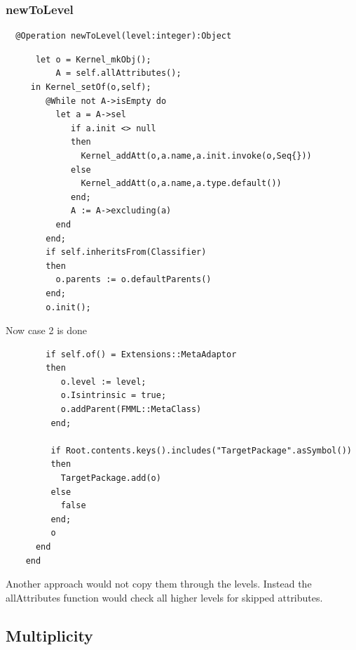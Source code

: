 \documentclass{scrreprt}
\newcounter{myCounter}[subsubsection]
\newcommand{\layerThree}[1]{\subsection{#1} \setcounter{myCounter}{0}}
\newcommand{\layerFour}[1]{\subsubsection{#1}}
\begin{document}
\layerFour{newToLevel}

\begin{verbatim}
  @Operation newToLevel(level:integer):Object
\end{verbatim}
\begin{verbatim}
      let o = Kernel_mkObj();
          A = self.allAttributes();
     in Kernel_setOf(o,self);
        @While not A->isEmpty do
          let a = A->sel
             if a.init <> null
             then
               Kernel_addAtt(o,a.name,a.init.invoke(o,Seq{}))
             else
               Kernel_addAtt(o,a.name,a.type.default())
             end;
             A := A->excluding(a)
          end
        end;
        if self.inheritsFrom(Classifier)
        then
          o.parents := o.defaultParents()
        end;
        o.init();
\end{verbatim}
Now case 2 is done
\begin{verbatim}
        if self.of() = Extensions::MetaAdaptor
        then
           o.level := level;
           o.Isintrinsic = true;
           o.addParent(FMML::MetaClass)
         end;
				
         if Root.contents.keys().includes("TargetPackage".asSymbol())
         then
           TargetPackage.add(o)
         else
           false
         end;
         o
      end
    end
\end{verbatim}

Another approach would not copy them through the levels. Instead the allAttributes function would check all higher levels for skipped attributes.

\layerThree{Multiplicity}
\end{document}
